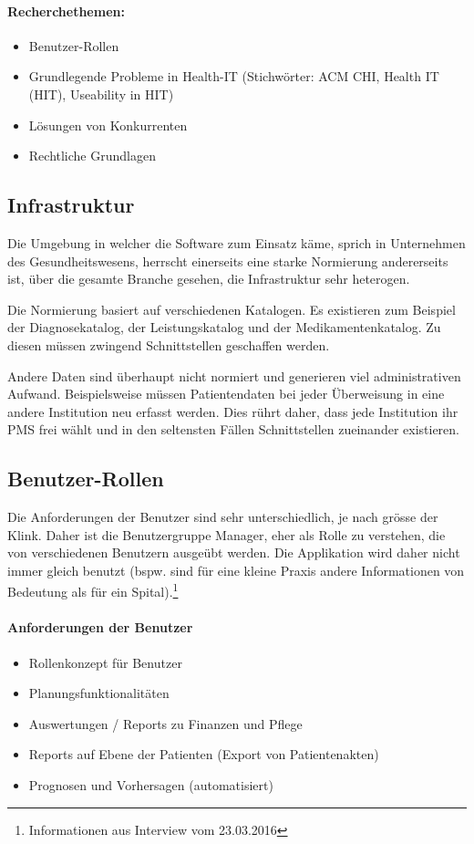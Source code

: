 \documentclass[a4paper]{scrreprt}
\begin{document}
\paragraph{Recherchethemen:} 
\begin{itemize}
\item Benutzer-Rollen
\item Grundlegende Probleme in Health-IT (Stichwörter: ACM CHI, Health IT (HIT), Useability in HIT)
\item Lösungen von Konkurrenten
\item Rechtliche Grundlagen
\end{itemize}

\subsection{Infrastruktur}
Die Umgebung in welcher die Software zum Einsatz käme, sprich in Unternehmen des Gesundheitswesens,
herrscht einerseits eine starke Normierung andererseits ist, über die gesamte Branche gesehen, die
Infrastruktur sehr heterogen.

Die Normierung basiert auf verschiedenen Katalogen. Es existieren zum Beispiel der Diagnosekatalog,
der Leistungskatalog und der Medikamentenkatalog. Zu diesen müssen zwingend Schnittstellen
geschaffen werden.

Andere Daten sind überhaupt nicht normiert und generieren viel administrativen Aufwand. Beispielsweise
müssen Patientendaten bei jeder Überweisung in eine andere Institution neu erfasst werden. Dies rührt
daher, dass jede Institution ihr PMS frei wählt und in den seltensten Fällen Schnittstellen
zueinander existieren.

\subsection{Benutzer-Rollen}
Die Anforderungen der Benutzer sind sehr unterschiedlich, je nach grösse der Klink. Daher ist die Benutzergruppe Manager, eher als Rolle zu verstehen, die von verschiedenen Benutzern ausgeübt werden. Die Applikation wird daher nicht immer gleich benutzt (bspw. sind für eine kleine Praxis andere Informationen von Bedeutung als für ein Spital).\footnote{Informationen aus Interview vom 23.03.2016}

\paragraph{Anforderungen der Benutzer}
\begin{itemize}
\item Rollenkonzept für Benutzer
\item Planungsfunktionalitäten
\item Auswertungen / Reports zu Finanzen und Pflege
\item Reports auf Ebene der Patienten (Export von Patientenakten)
\item Prognosen und Vorhersagen (automatisiert)
\end{itemize}
\end{document}
